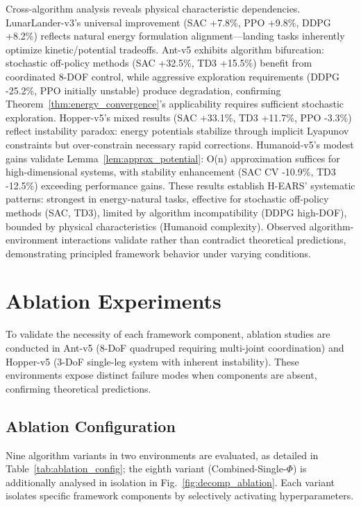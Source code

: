 \documentclass[journal]{IEEEtran}
\begin{document}
	Cross-algorithm analysis reveals physical characteristic dependencies. LunarLander-v3's universal improvement (SAC +7.8\%, PPO +9.8\%, DDPG +8.2\%) reflects natural energy formulation alignment—landing tasks inherently optimize kinetic/potential tradeoffs. Ant-v5 exhibits algorithm bifurcation: stochastic off-policy methods (SAC +32.5\%, TD3 +15.5\%) benefit from coordinated 8-DOF control, while aggressive exploration requirements (DDPG -25.2\%, PPO initially unstable) produce degradation, confirming Theorem~\ref{thm:energy_convergence}'s applicability requires sufficient stochastic exploration. Hopper-v5's mixed results (SAC +33.1\%, TD3 +11.7\%, PPO -3.3\%) reflect instability paradox: energy potentials stabilize through implicit Lyapunov constraints but over-constrain necessary rapid corrections. Humanoid-v5's modest gains validate Lemma~\ref{lem:approx_potential}: O(n) approximation suffices for high-dimensional systems, with stability enhancement (SAC CV -10.9\%, TD3 -12.5\%) exceeding performance gains. These results establish H-EARS' systematic patterns: strongest in energy-natural tasks, effective for stochastic off-policy methods (SAC, TD3), limited by algorithm incompatibility (DDPG high-DOF), bounded by physical characteristics (Humanoid complexity). Observed algorithm-environment interactions validate rather than contradict theoretical predictions, demonstrating principled framework behavior under varying conditions.
	
	\section{Ablation Experiments}
	\label{sec:ablation}
	
	To validate the necessity of each framework component, ablation studies are conducted in Ant-v5 (8-DoF quadruped requiring multi-joint coordination) and Hopper-v5 (3-DoF single-leg system with inherent instability). These environments expose distinct failure modes when components are absent, confirming theoretical predictions.
	
	\subsection{Ablation Configuration}
	
	Nine algorithm variants in two environments are evaluated, as detailed in Table~\ref{tab:ablation_config}; the eighth variant (Combined-Single-$\Phi$) is additionally analysed in isolation in Fig.~\ref{fig:decomp_ablation}. Each variant isolates specific framework components by selectively activating hyperparameters.
	
\end{document}

